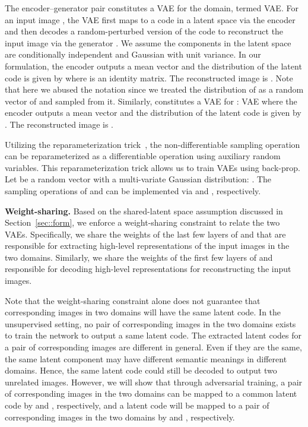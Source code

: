 \documentclass{article}
\begin{document}
 The encoder--generator pair  constitutes a VAE for the  domain, termed VAE. For an input image , the VAE first maps  to a code in a latent space  via the encoder  and then decodes a random-perturbed version of the code to reconstruct the input image via the generator . We assume the components in the latent space  are conditionally independent and Gaussian with unit variance. In our formulation, the encoder outputs a mean vector  and the distribution of the latent code  is given by  where  is an identity matrix. The reconstructed image is . Note that here we abused the notation since we treated the distribution of  as a random vector of  and sampled from it. Similarly,  constitutes a VAE for : VAE where the encoder  outputs a mean vector  and the distribution of the latent code  is given by . The reconstructed image is . 


Utilizing the reparameterization trick~\cite{kingma2013auto}, the non-differentiable sampling operation can be reparameterized as a differentiable operation using auxiliary random variables. This reparameterization trick allows us to train VAEs using back-prop. Let  be a random vector with a multi-variate Gaussian distribution: . The sampling operations of  and  can be implemented via  and , respectively.



{\bf Weight-sharing.} Based on the shared-latent space assumption discussed in Section~\ref{sec::form}, we enforce a weight-sharing constraint to relate the two VAEs. Specifically, we share the weights of the last few layers of  and  that are responsible for extracting high-level representations of the input images in the two domains. Similarly, we share the weights of the first few layers of  and  responsible for decoding high-level representations for reconstructing the input images.


Note that the weight-sharing constraint alone does not guarantee that corresponding images in two domains will have the same latent code. In the unsupervised setting, no pair of corresponding images in the two domains exists to train the network to output a same latent code. The extracted latent codes for a pair of corresponding images are different in general. Even if they are the same, the same latent component may have different semantic meanings in different domains. Hence, the same latent code could still be decoded to output two unrelated images. However, we will show that through adversarial training, a pair of corresponding images in the two domains can be mapped to a common latent code by  and , respectively, and a latent code will be mapped to a pair of corresponding images in the two domains by  and , respectively.  
\end{document}
